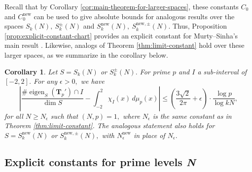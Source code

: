 \documentclass[11pt,letterpaper,reqno]{amsart}
\newtheorem{corollary}[theorem]{Corollary}
\theoremstyle{definition}
\numberwithin{equation}{section}
\numberwithin{figure}{section}
\numberwithin{table}{section}
\let\subsectiontemp\subsection
\renewcommand{\subsection}[1]{ 
    \subsectiontemp{#1} \hfill\vspace{0.5\linespacing} 
}
\newcommand{\nw}{\mathrm{new}}
\begin{document}
Recall that by Corollary \ref{cor:main-theorem-for-larger-spaces}, these constants $C_0$ and $C_0^\nw$ can be used to give absolute bounds for analogous results over the spaces $S_k(N),\  S_k^\pm(N)$ and $S_k^\nw(N),\ S_k^{\nw,\pm}{(N)}.$ Thus, Proposition \ref{prop:explicit-constant-chart} provides an explicit constant for Murty--Sinha's main result \cite[Theorem 2]{MS07}. Likewise, analogs of Theorem \ref{thm:limit-constant} hold over these larger spaces, as we summarize in the corollary below.

\begin{corollary} \label{cor-limit-constant-2}
    Let $S = S_k(N)$ or $S_k^\pm(N).$ For prime $p$ and $I$ a sub-interval of $[-2, 2]$. For any $\epsilon > 0,$ we have 
    $$\left| \frac{\# \operatorname{eigen}_{S}(\mathbf{T}_p') \cap I }{\dim S} - \int_{-2}^2 \chi_I(x) \, d \mu_p(x)  \right| \leq \left(\frac{3\sqrt{2}}{2\pi} + \epsilon \right) \cdot  \frac{\log p}{\log  kN},$$
    for all $N \geq N_\epsilon$ such that $(N, p) = 1,$ where $N_\epsilon$ is the same constant as in Theorem \ref{thm:limit-constant}. The analogous statement also holds for $S = S_k^{\nw}(N)$ or $S_k^{\nw, \pm }(N),$ with $N_\epsilon^\nw$ in place of $N_\epsilon.$
\end{corollary}

\subsection{Explicit constants for prime levels \textit{N}}\label{subsection:constants-for-prime-level}
\end{document}
